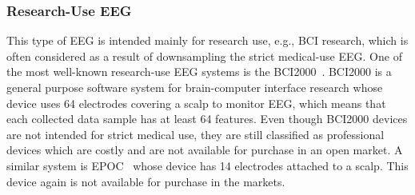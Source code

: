 \subsubsection{Research-Use EEG}
This type of EEG is intended mainly for research use, e.g., BCI research, which is often considered as a result of downsampling the strict medical-use EEG. One of the most well-known research-use EEG systems is the BCI2000~\cite{schalk2004bci2000}. BCI2000 is a general purpose software system for brain-computer interface research whose device uses 64 electrodes covering a scalp to monitor EEG, which means that each collected data sample has at least 64 features. %
Even though BCI2000 devices are not intended for strict medical use, they are still classified as professional devices which are costly and are not available for purchase in an open market. A similar system is EPOC~\cite{stytsenko2011evaluation} whose device has 14 electrodes attached to a scalp. This device again is not available for purchase in the markets. %

